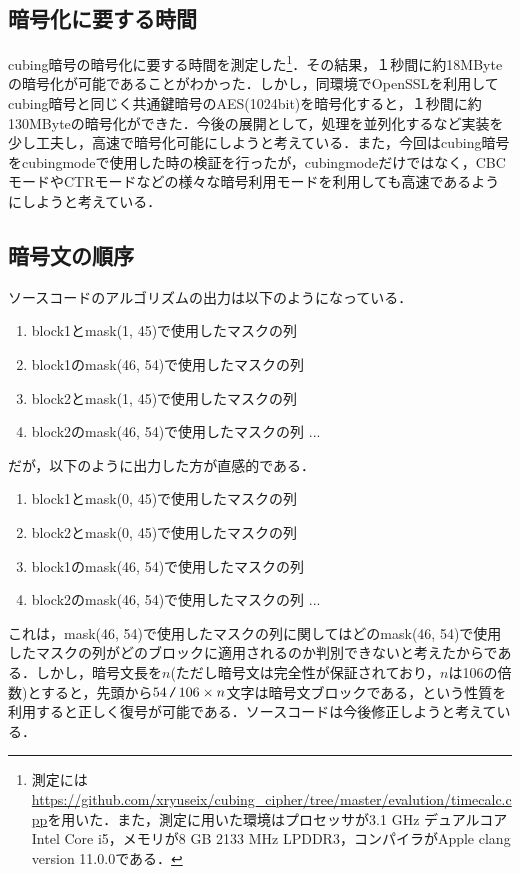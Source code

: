 \documentclass[a4j,titlepage]{jsarticle}
\newcommand{\code}[1]{ \texttt{\detokenize{#1}} }
\begin{document}
\subsection{暗号化に要する時間}
cubing暗号の暗号化に要する時間を測定した\footnote{測定には\url{https://github.com/xryuseix/cubing_cipher/tree/master/evalution/timecalc.cpp}を用いた．また，測定に用いた環境はプロセッサが3.1 GHz デュアルコアIntel Core i5，メモリが8 GB 2133 MHz LPDDR3，コンパイラがApple clang version 11.0.0である．}．その結果，１秒間に約18MByteの暗号化が可能であることがわかった．しかし，同環境でOpenSSLを利用してcubing暗号と同じく共通鍵暗号のAES(1024bit)を暗号化すると，１秒間に約130MByteの暗号化ができた．今後の展開として，処理を並列化するなど実装を少し工夫し，高速で暗号化可能にしようと考えている．また，今回はcubing暗号をcubingmodeで使用した時の検証を行ったが，cubingmodeだけではなく，CBCモードやCTRモードなどの様々な暗号利用モードを利用しても高速であるようにしようと考えている．

\subsection{暗号文の順序}
ソースコードのアルゴリズムの出力は以下のようになっている．\\
\begin{screen}
  \begin{enumerate}
    \item block1とmask(\phantom{0}1, 45)で使用したマスクの列
    \item block1のmask(46, 54)で使用したマスクの列
    \item block2とmask(\phantom{0}1, 45)で使用したマスクの列
    \item block2のmask(46, 54)で使用したマスクの列 ...
  \end{enumerate}
\end{screen}
だが，以下のように出力した方が直感的である．
\begin{screen}
  \begin{enumerate}
    \item block1とmask(\phantom{0}0, 45)で使用したマスクの列
    \item block2とmask(\phantom{0}0, 45)で使用したマスクの列
    \item block1のmask(46, 54)で使用したマスクの列
    \item block2のmask(46, 54)で使用したマスクの列 ...
  \end{enumerate}
\end{screen}
これは，mask(46, 54)で使用したマスクの列に関してはどのmask(46, 54)で使用したマスクの列がどのブロックに適用されるのか判別できないと考えたからである．しかし，暗号文長を\(n\)(ただし暗号文は完全性が保証されており，\(n\)は106の倍数)とすると，先頭から\(54\,\code{/}\,106 \times n\)文字は暗号文ブロックである，という性質を利用すると正しく復号が可能である．ソースコードは今後修正しようと考えている．
\end{document}
